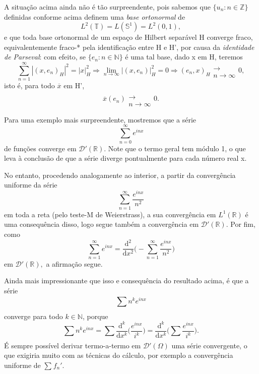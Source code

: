 \documentclass[../distribution_theory_notes.tex]{subfiles}
\begin{document}
A situação acima ainda não é tão surpreendente, pois sabemos que \(\{u_{n}:n\in \mathbb{Z}\}\) definidas conforme acima definem uma \textit{base ortonormal} de
\[
	L^{2}(\mathbb{T}) = L(\mathbb{S}^{1}) = L^{2}(0, 1),
\]
e que toda base ortonormal de um espaço de Hilbert separável H converge fraco, equivalentemente fraco-* pela identificação entre H e H', por causa da \textit{identidade de Parseval}: com efeito, se \(\{e_{n}:n\in \mathbb{N}\}\) é uma tal base, dado x em H, teremos
\[
	\sum\limits_{n=1}^{\infty}| (x, e_{n})_{H} |^{2} = | x |_{H}^{2} \Rightarrow \lim_{n\to \infty}| (x, e_{n}) |_{H}^{2} = 0 \Rightarrow (e_{n}, x)_H\substack{ \\ \longrightarrow \\ n\to \infty}0,
\]
isto é, para todo \(\overline{x}\) em H',
\[
	\overline{x}(e_{n})\substack{ \\ \longrightarrow \\ n\to \infty}0.
\]
\begin{example}
	Para uma exemplo mais surpreendente, mostremos que a série
	\[
		\sum\limits_{n=0}^{\infty}e^{inx}
	\]
	de funções converge em \(\mathcal{D}'(\mathbb{R})\). Note que o termo geral tem módulo 1, o que leva à conclusão de que a série diverge pontualmente para cada número real x.

	No entanto, procedendo analogamente ao interior, a partir da convergência uniforme da série
	\[
		\sum\limits_{n=1}^{\infty}\frac{e^{inx}}{n^{2}}
	\]
	em toda a reta (pelo teste-M de Weierstrass), a sua convergência em \(L^{1}(\mathbb{R})\) é uma consequência disso, logo segue também a convergência em \(\mathcal{D}'(\mathbb{R})\). Por fim, como
	\[
		\sum\limits_{n=1}^{\infty}e^{inx} = \frac{\mathrm{d}^{2}}{\mathrm{d}x^{2}}\biggl(-\sum\limits_{n=1}^{\infty}\frac{e^{inx}}{n^{2}}\biggr)
	\]
	em \(\mathcal{D}'(\mathbb{R}),\) a afirmação segue.

	Ainda mais impressionante que isso e consequência do resultado acima, é que a série
	\[
		\sum\limits_{}^{}n^{k}e^{inx}
	\]
	converge para todo \(k\in \mathbb{N}\), porque
	\[
		\sum\limits_{}^{}n^{k}e^{inx} = \sum\limits_{}^{}\frac{\mathrm{d}^{k}}{\mathrm{d}x^{k}}\biggl(\frac{e^{inx}}{i^{k}}\biggr) = \frac{\mathrm{d}^{k}}{\mathrm{d}x^{k}}\biggl(\sum\limits_{}^{}\frac{e^{inx}}{i^{k}}\biggr).
	\]
	É sempre possível derivar termo-a-termo em \(\mathcal{D}'(\Omega )\) uma série convergente, o que exigiria muito com as técnicas do cálculo, por exemplo a convergência uniforme de \(\sum\limits_{}^{}f_{n}'\).
\end{example}
\end{document}
